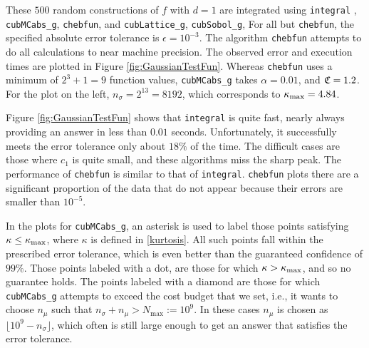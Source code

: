\documentclass{iitthesis}
\theoremstyle{definition}
\begin{document}
These $500$ random constructions of $f$ with $d=1$ are integrated using {\tt integral} \cite{Shampone08},  {\tt cubMCabs\_g}, {\tt chebfun}\cite{Chebfun14}, and {\tt cubLattice\_g}\cite{JimHic16a}, {\tt cubSobol\_g}\cite{HicJim16a}, 
%
For all but {\tt chebfun}, the specified absolute error tolerance is $\epsilon=10^{-3}$.  The algorithm {\tt chebfun} attempts to do all calculations to near machine precision.  The observed error and execution times are plotted in Figure \ref{fig:GaussianTestFun}.  Whereas {\tt chebfun} uses a minimum of $2^3+1=9$ function values, {\tt cubMCabs\_g}  takes $\alpha=0.01$, and $\mathfrak{C}=1.2$.  For the plot on the left, $n_\sigma=2^{13}=8192$, which corresponds to  $\kappa_{\max}=4.84$. 
%

Figure \ref{fig:GaussianTestFun} shows that {\tt integral} is quite fast, nearly always providing an answer in less than $0.01$ seconds.  Unfortunately, it successfully meets the error tolerance only about $18\%$ of the time.  The difficult cases are those where $c_1$ is quite small, and these algorithms miss the sharp peak.  The performance of {\tt chebfun} is similar to that of {\tt integral}. {\tt chebfun} plots there are a significant proportion of the data that do not appear because their errors are smaller than $10^{-5}$.
%

In the plots for {\tt cubMCabs\_g}, an asterisk is used to label those points satisfying $\kappa \le \kappa_{\max}$, where $\kappa$ is defined in \eqref{kurtosis}. All such points fall within the prescribed error tolerance,
which is even better than the guaranteed confidence of $99\%$.  Those points labeled with a dot, are those for which $\kappa > \kappa_{\max}$, and so no guarantee holds. The points labeled with a diamond are those for which  {\tt cubMCabs\_g}  attempts to exceed the cost budget that we set, i.e., it wants to choose $n_\mu$ such that $n_{\sigma}+n_\mu > N_{\max}:=10^9$. In these cases $n_\mu$ is chosen as $\lfloor 10^9 - n_\sigma \rfloor$, which often is still large enough to get an answer that satisfies the error tolerance. 
\end{document}
